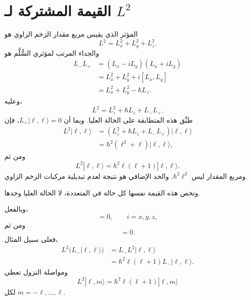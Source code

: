 \section{القيمة المشتركة لـ \texorpdfstring{\(L^2\)}{مربع L}}

المؤثر الذي يقيس مربع مقدار الزخم الزاوي هو \begin{equation}
L^2=L_x^2+L_y^2+L_z^2.
\end{equation} والجداء المرتب لمؤثري السُّلَّم هو \begin{align}
L_-L_+
&=(L_x-iL_y)(L_x+iL_y) \\
&=L_x^2+L_y^2+i[L_x,L_y] \\
&=L_x^2+L_y^2-\hbar L_z.
\end{align} وعليه، \begin{equation}
L^2=L_z^2+\hbar L_z+L_-L_+.
\end{equation} طبِّق هذه المتطابقة على الحالة العليا. وبما أن \(L_+|\ell,\ell\rangle=0\)، فإن \begin{align}
L^2|\ell,\ell\rangle
&=\left(L_z^2+\hbar L_z+L_-L_+\right)|\ell,\ell\rangle \\
&=\hbar^2\left(\ell^2+\ell\right)|\ell,\ell\rangle,
\end{align} ومن ثم \begin{equation}
L^2|\ell,\ell\rangle
=\hbar^2\ell(\ell+1)|\ell,\ell\rangle.
\end{equation} ومربع المقدار ليس \(\hbar^2\ell^2\). والحد الإضافي هو نتيجة لعدم تبديلية مركبات الزخم الزاوي.

وتخص هذه القيمة نفسها كل حالة في المتعددة، لا الحالة العليا وحدها.

\begin{classroomqa}\end{classroomqa}

وبالفعل، \begin{equation}
[L^2,L_i]=0,
\qquad i=x,y,z,
\end{equation} ومن ثم \begin{equation}
[L^2,L_\pm]=0.
\end{equation} فعلى سبيل المثال، \begin{align}
L^2\bigl(L_-|\ell,\ell\rangle\bigr)
&=L_-L^2|\ell,\ell\rangle \\
&=\hbar^2\ell(\ell+1)L_-|\ell,\ell\rangle.
\end{align} ومواصلة النزول تعطي \begin{equation}
L^2|\ell,m\rangle
=\hbar^2\ell(\ell+1)|\ell,m\rangle
\end{equation} لكل \(m=-\ell,\ldots,\ell\).

